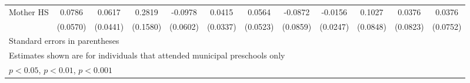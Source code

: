 \begin{table}[htbp]
\begin{tabular}{l*{11}{c}}
\addlinespace
Mother HS   &      0.0786         &      0.0617         &      0.2819         &     -0.0978         &      0.0415         &      0.0564         &     -0.0872         &     -0.0156         &      0.1027         &      0.0376         &      0.0376         \\
            &    (0.0570)         &    (0.0441)         &    (0.1580)         &    (0.0602)         &    (0.0337)         &    (0.0523)         &    (0.0859)         &    (0.0247)         &    (0.0848)         &    (0.0823)         &    (0.0752)         \\
\bottomrule
\multicolumn{12}{l}{\footnotesize Standard errors in parentheses}\\
\multicolumn{12}{l}{\footnotesize Estimates shown are for individuals that attended municipal preschools only}\\
\multicolumn{12}{l}{\footnotesize \sym{*} \(p<0.05\), \sym{**} \(p<0.01\), \sym{***} \(p<0.001\)}\\
\end{tabular}
\end{table}
